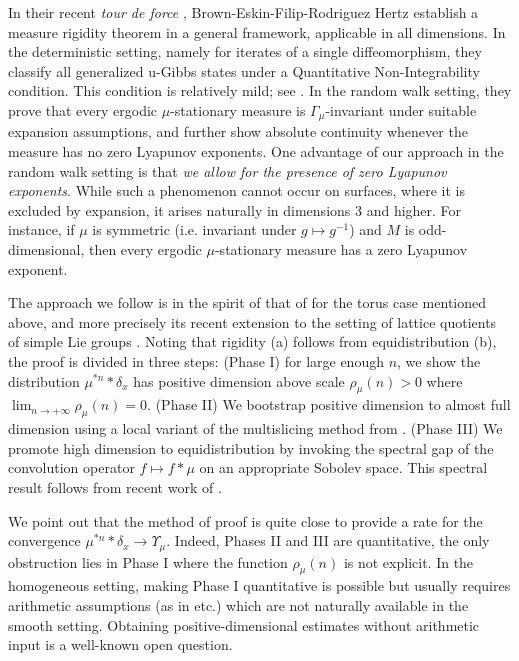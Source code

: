 \documentclass[11pt, leqno, fleqn]{amsart}
\theoremstyle{definition}
\theoremstyle{definition}
\begin{document}
In their recent {\it tour de force} \cite{BEFRH}, Brown-Eskin-Filip-Rodriguez Hertz establish a measure rigidity theorem in a  general framework, applicable in all dimensions. In the deterministic setting, namely for iterates of a single diffeomorphism, they classify all generalized u-Gibbs states under a Quantitative Non-Integrability condition. This condition is relatively mild; see \cite{EPZ, ES}.
In the random walk setting, they prove that every ergodic $\mu$-stationary measure is $\Gamma_{\mu}$-invariant under suitable expansion assumptions, and further show absolute continuity whenever the measure has no zero Lyapunov exponents.
One advantage of our approach in the random walk setting is that \emph{we allow for the presence of zero Lyapunov exponents}. 
While such a phenomenon cannot occur on surfaces, where it is  excluded by expansion, it arises naturally in dimensions $3$ and higher. For instance, if $\mu$ is symmetric (i.e. invariant under $g\mapsto g^{-1}$) and $M$  is odd-dimensional, then every ergodic $\mu$-stationary measure has a zero Lyapunov exponent. 




    

The approach we follow is in the spirit  of that of \cite{BFLM} for the torus case mentioned above, and more precisely its recent extension to the setting of lattice quotients of simple Lie groups \cite{BH1, BH2}. Noting that rigidity  (a) follows from equidistribution (b), the proof is divided in three steps: (Phase I) for large enough $n$, we show the distribution $\mu^{*n}*\delta_{x}$ has positive dimension above scale $\rho_{\mu}(n)>0$ where $\lim_{n\to +\infty}\rho_{\mu}(n)=0$. (Phase II) We bootstrap positive dimension to almost full dimension using a local variant of the multislicing method from \cite{BH1, BH2}. (Phase III)  We promote high dimension to equidistribution by invoking the spectral gap of the convolution operator $f\mapsto f*\mu$ on an appropriate Sobolev space. This spectral result follows from recent work of  \cite{DD, DDZ}. 

We point out that the method of proof is quite close to provide a rate for the  convergence $\mu^{*n}*\delta_{x}\rightarrow \Upsilon_{\mu}$. Indeed, Phases II and III are quantitative, the only obstruction lies in Phase I where the function $\rho_{\mu}(n)$ is not explicit. In the homogeneous setting, making Phase I quantitative is possible but usually requires arithmetic assumptions (as in \cite{BFLM, BH1, BH2, BG, LMW,Y} etc.) which are not naturally available in the smooth setting. Obtaining positive-dimensional  estimates without arithmetic input is a well-known open question.
\end{document}
